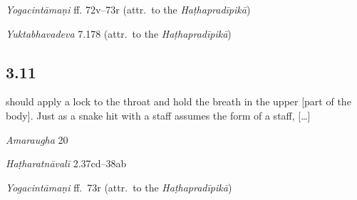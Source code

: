\begin{ekdosis}
\begin{testimonia}[hp03_010]
\emph{Yogacintāmaṇi} ff. 72v–73r (attr.~to the \emph{Haṭhapradīpikā})
\begin{versinnote}
\end{versinnote}

\emph{Yuktabhavadeva} 7.178 (attr.~to the \emph{Haṭhapradīpikā})
\begin{versinnote}
\end{versinnote}
\end{testimonia}


\subsection*{3.11}
\begin{translation} should apply a lock to the throat and hold the breath in the upper [part of the body]. Just as a snake hit with a staff assumes the form of a staff, [\dots] 
\end{translation}

\begin{sources}[hp03_011]
\emph{Amaraugha} 20
\begin{versinnote}
\end{versinnote}
\end{sources}

\begin{testimonia}[hp03_011]
\emph{Haṭharatnāvalī} 2.37cd–38ab
\begin{versinnote}
\end{versinnote}

\emph{Yogacintāmaṇi} ff.~73r (attr.~to the \emph{Haṭhapradīpikā})
\begin{versinnote}
\end{versinnote}


\end{testimonia}
\end{ekdosis}
